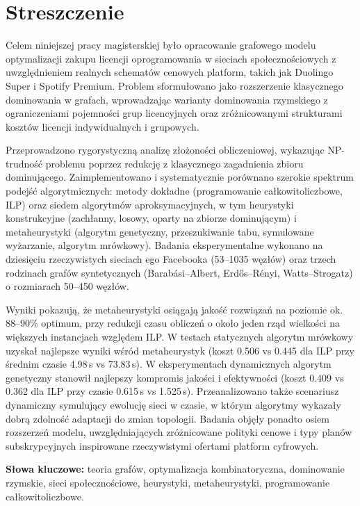 \section*{Streszczenie}

Celem niniejszej pracy magisterskiej było opracowanie grafowego modelu optymalizacji zakupu licencji oprogramowania w sieciach społecznościowych z uwzględnieniem realnych schematów cenowych platform, takich jak Duolingo Super i Spotify Premium. Problem sformułowano jako rozszerzenie klasycznego dominowania w grafach, wprowadzając warianty dominowania rzymskiego z ograniczeniami pojemności grup licencyjnych oraz zróżnicowanymi strukturami kosztów licencji indywidualnych i grupowych.

Przeprowadzono rygorystyczną analizę złożoności obliczeniowej, wykazując NP-trudność problemu poprzez redukcję z klasycznego zagadnienia zbioru dominującego. Zaimplementowano i systematycznie porównano szerokie spektrum podejść algorytmicznych: metody dokładne (programowanie całkowitoliczbowe, ILP) oraz siedem algorytmów aproksymacyjnych, w tym heurystyki konstrukcyjne (zachłanny, losowy, oparty na zbiorze dominującym) i metaheurystyki (algorytm genetyczny, przeszukiwanie tabu, symulowane wyżarzanie, algorytm mrówkowy). Badania eksperymentalne wykonano na dziesięciu rzeczywistych sieciach ego Facebooka (53--1035 węzłów) oraz trzech rodzinach grafów syntetycznych (Barabási--Albert, Erdős--Rényi, Watts--Strogatz) o rozmiarach 50--450 węzłów.

Wyniki pokazują, że metaheurystyki osiągają jakość rozwiązań na poziomie ok. 88--90\% optimum, przy redukcji czasu obliczeń o około jeden rząd wielkości na większych instancjach względem ILP. W testach statycznych algorytm mrówkowy uzyskał najlepsze wyniki wśród metaheurystyk (koszt 0.506 vs 0.445 dla ILP przy średnim czasie 4.98\,s vs 73.83\,s). W eksperymentach dynamicznych algorytm genetyczny stanowił najlepszy kompromis jakości i efektywności (koszt 0.409 vs 0.362 dla ILP przy czasie 0.615\,s vs 1.525\,s). Przeanalizowano także scenariusz dynamiczny symulujący ewolucję sieci w czasie, w którym algorytmy wykazały dobrą zdolność adaptacji do zmian topologii. Badania objęły ponadto osiem rozszerzeń modelu, uwzględniających zróżnicowane polityki cenowe i typy planów subskrypcyjnych inspirowane rzeczywistymi ofertami platform cyfrowych.

\textbf{Słowa kluczowe:} teoria grafów, optymalizacja kombinatoryczna, dominowanie rzymskie, sieci społecznościowe, heurystyki, metaheurystyki, programowanie całkowitoliczbowe.
